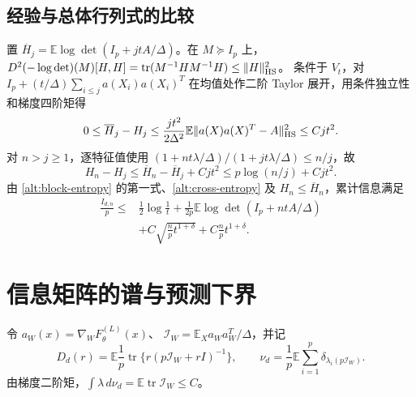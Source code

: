 \documentclass[a4paper]{tufte-handout}
\newcommand{\E}{\mathbb E}
\DeclareMathOperator{\tr}{tr}
\begin{document}
\begin{fullwidth}
\subsection{经验与总体行列式的比较}
置 $\overline H_j=\E\log\det(I_p+jtA/\Delta)$。在 $M\succeq I_p$ 上，
$D^2(-\log\det)(M)[H,H]=\tr(M^{-1}HM^{-1}H)\le\|H\|_{\rm HS}^2$。
条件于 $V_t$，对 $I_p+(t/\Delta)\sum_{i\le j}a(X_i)a(X_i)^T$
在均值处作二阶 Taylor 展开，用条件独立性和梯度四阶矩得
\[
 0\le\overline H_j-H_j
 \le\frac{jt^2}{2\Delta^2}\E\|a(X)a(X)^T-A\|_{\rm HS}^2\le Cjt^2.
\]
对 $n>j\ge1$，逐特征值使用 $(1+nt\lambda/\Delta)/(1+jt\lambda/\Delta)\le n/j$，故
\[
 H_n-H_j\le\overline H_n-\overline H_j+Cjt^2\le p\log(n/j)+Cjt^2.
\]
由 \eqref{alt:block-entropy} 的第一式、\eqref{alt:cross-entropy}
及 $H_n\le\overline H_n$，累计信息满足
\begin{equation}\label{eq:sample-information-upper}\begin{aligned}
 \frac{I_{d,n}}p\le{}&\frac12\log\frac1t
  +\frac1{2p}\E\log\det(I_p+ntA/\Delta)\\
 &+C\sqrt{\frac np t^{1+\delta}}+C\frac np t^{1+\delta}.
\end{aligned}\end{equation}

\section{信息矩阵的谱与预测下界}
令 $a_W(x)=\nabla_WF_\theta^{(L)}(x)$、
$\mathcal I_W=\E_Xa_Wa_W^T/\Delta$，并记
\[
 D_d(r)=\E\frac1p\tr\{r(p\mathcal I_W+rI)^{-1}\},\qquad
 \nu_d=\frac1p\E\sum_{i=1}^p\delta_{\lambda_i(p\mathcal I_W)}.
\]
由梯度二阶矩，$\int\lambda\,d\nu_d=\E\tr\mathcal I_W\le C$。


\end{fullwidth}
\end{document}
